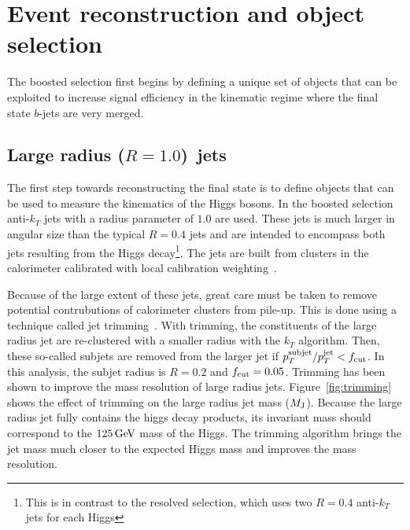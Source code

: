 \section{Event reconstruction and object selection}

The boosted selection first begins by defining a unique set of objects that can be exploited to increase signal efficiency in the kinematic regime where the final state $b$-jets are very merged. 

\subsection{Large radius ($R = 1.0$)\, jets}

The first step towards reconstructing the final state is to define objects that can be used to measure the kinematics of the Higgs bosons. In the boosted selection anti-$k_{T}$ jets with a radius parameter of $1.0$ are used. These jets is much larger in angular size than the typical $R=0.4$ jets and are intended to encompass both jets resulting from the Higgs decay\footnote{This is in contrast to the resolved selection, which uses two $R=0.4$ anti-$k_{T}$ jets for each Higgs}. The jets are built from clusters in the calorimeter calibrated with local calibration weighting~\cite{JetCalib}. 

Because of the large extent of these jets, great care must be taken to remove potential contrubutions of calorimeter clusters from pile-up. This is done using a technique called jet trimming~\cite{Trimming}. With trimming, the constituents of the large radius jet are re-clustered with a smaller radius with the $k_{T}$ algorithm. Then, these so-called subjets are removed from the larger jet if $p_{T}^{\rm subjet}/p_{T}^{\rm jet} < f_{\rm cut}$. In this analysis, the subjet radius is $R = 0.2$ and $f_{\rm cut} = 0.05$. Trimming has been shown to improve the mass resolution of large radius jets. Figure~\ref{fig:trimming} shows the effect of trimming on the large radius jet mass ($M_{\rm J}$). Because the large radius jet fully contains the higgs decay products, its invariant mass should correspond to the $125 \GeV$ mass of the Higgs. The trimming algorithm brings the jet mass much closer to the expected Higgs mass and improves the mass resolution. 

